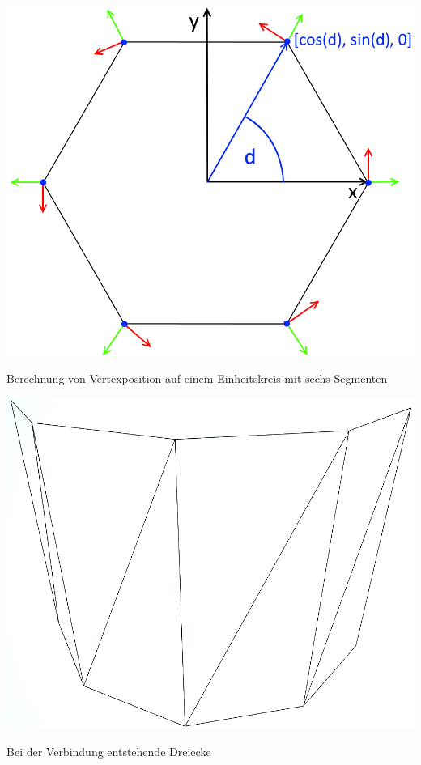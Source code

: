 \newpage
\begin{center}
	\includegraphics[height=.9\textheight]{images/CH4_Ring6Sections.png}
	
	Berechnung von Vertexposition auf einem Einheitskreis mit sechs Segmenten
\end{center}




\newpage
\begin{center}
	\includegraphics[height=.9\textheight]{images/CH4_Zylinder10SegmenteWireframe.png}
	
	Bei der Verbindung entstehende Dreiecke
\end{center}




